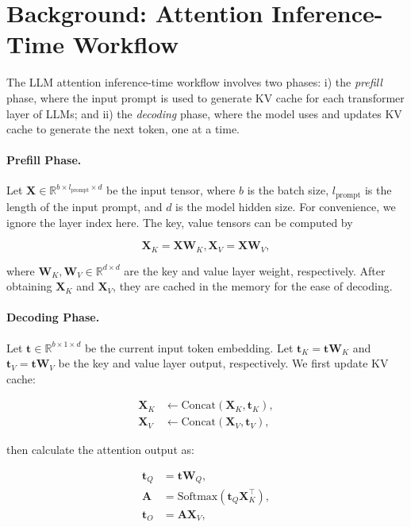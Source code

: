 \section{Background: Attention Inference-Time Workflow}
\label{sec: background}

The LLM attention inference-time workflow involves two phases: i) the \textit{prefill} phase, where the input prompt is used to generate KV cache for each transformer layer of LLMs; and ii) the \textit{decoding} phase, where the model uses and updates KV cache to generate the next token, one at a time. 

\paragraph{Prefill Phase.} Let ${\bm{X}} \in \mathbb{R}^{b\times l_{\text{prompt}} \times d}$ be the input tensor, where $b$ is the batch size, $l_{\text{prompt}}$ is the length of the input prompt, and $d$ is the model hidden size. For convenience, we ignore the layer index here. The key, value tensors can be computed by

\begin{equation}
    {\bm{X}}_K= {\bm{X}} {\bm{W}}_K, {\bm{X}}_V = {\bm{X}} {\bm{W}}_V, \nonumber
\end{equation}

where ${\bm{W}}_K, {\bm{W}}_V\in\mathbb{R}^{d\times d}$ are the key and value layer weight, respectively.  After obtaining ${\bm{X}}_K$ and ${\bm{X}}_V$, they are cached in the memory for the ease of decoding.

\paragraph{Decoding Phase.} Let ${\bm{t}} \in \mathbb{R}^{b\times 1 \times d}$ be the current input token embedding. Let ${\bm{t}}_K={\bm{t}} {\bm{W}}_K$ and ${\bm{t}}_V={\bm{t}} {\bm{W}}_V$ be the key and value layer output, respectively. We first update KV cache:

\begin{align}
    {\bm{X}}_K &\leftarrow \text{Concat} ({\bm{X}}_K, {\bm{t}}_K), \nonumber \\
    {\bm{X}}_V &\leftarrow \text{Concat} ({\bm{X}}_V,  {\bm{t}}_V ) \nonumber,     
\end{align}

then calculate the attention output as:

\begin{align}
 {\bm{t}}_Q &= {\bm{t}} {\bm{W}}_Q,   \nonumber \\
  {\bm{A}} &= \text{Softmax} ({\bm{t}}_Q {\bm{X}}^{\top}_K),  \nonumber \\
 {\bm{t}}_O &= {\bm{A}}{\bm{X}}_V,
 \label{eq: av}
\end{align}

